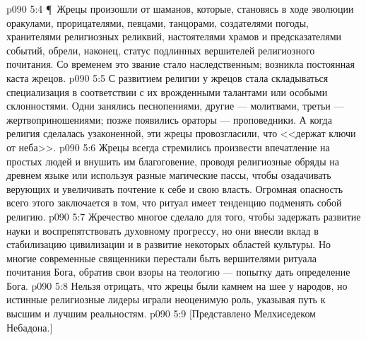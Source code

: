 \vs p090 5:4 \P\ Жрецы произошли от шаманов, которые, становясь в ходе эволюции оракулами, прорицателями, певцами, танцорами, создателями погоды, хранителями религиозных реликвий, настоятелями храмов и предсказателями событий, обрели, наконец, статус подлинных вершителей религиозного почитания. Со временем это звание стало наследственным; возникла постоянная каста жрецов.
\vs p090 5:5 С развитием религии у жрецов стала складываться специализация в соответствии с их врожденными талантами или особыми склонностями. Одни занялись песнопениями, другие --- молитвами, третьи --- жертвоприношениями; позже появились ораторы --- проповедники. А когда религия сделалась узаконенной, эти жрецы провозгласили, что <<держат ключи от неба>>.
\vs p090 5:6 Жрецы всегда стремились произвести впечатление на простых людей и внушить им благоговение, проводя религиозные обряды на древнем языке или используя разные магические пассы, чтобы озадачивать верующих и увеличивать почтение к себе и свою власть. Огромная опасность всего этого заключается в том, что ритуал имеет тенденцию подменять собой религию.
\vs p090 5:7 Жречество многое сделало для того, чтобы задержать развитие науки и воспрепятствовать духовному прогрессу, но они внесли вклад в стабилизацию цивилизации и в развитие некоторых областей культуры. Но многие современные священники перестали быть вершителями ритуала почитания Бога, обратив свои взоры на теологию --- попытку дать определение Бога.
\vs p090 5:8 Нельзя отрицать, что жрецы были камнем на шее у народов, но истинные религиозные лидеры играли неоценимую роль, указывая путь к высшим и лучшим реальностям.
\vs p090 5:9 [Представлено Мелхиседеком Небадона.]
